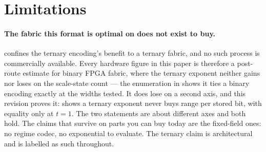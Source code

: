 \section{Limitations}\label{sec:limitations-anchor}\label{sec:limits}



\paragraph{The fabric this format is optimal on does not exist to buy.}
 confines the ternary encoding's benefit to a ternary
fabric, and no such process is commercially available. Every hardware figure in
this paper is therefore a post-route estimate for binary FPGA fabric, where the
ternary exponent neither gains nor loses on the scale-state count --- the
enumeration in  shows it ties a binary encoding
exactly at the widths tested. It does lose on a second axis, and this revision
proves it:  shows a ternary exponent never buys range
per stored bit, with equality only at $t=1$. The two statements are about
different axes and both hold. The claims that survive on parts you can buy today are the fixed-field
ones: no regime codec, no exponential to
evaluate. The ternary claim is architectural and is labelled as such throughout.

